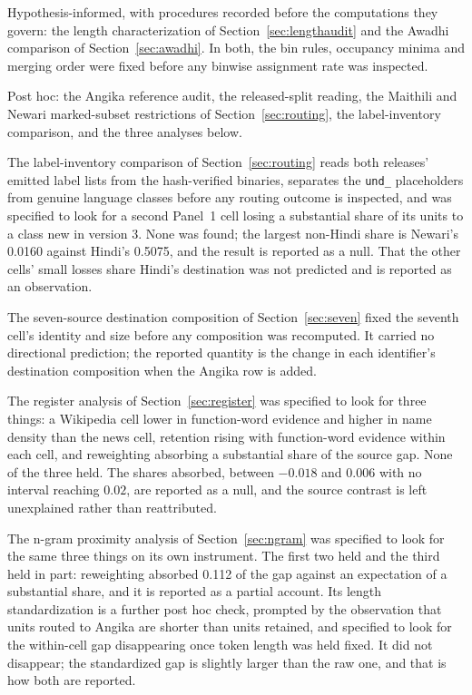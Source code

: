 \documentclass[final]{clv2025}
\newcommand{\lab}[1]{\texttt{#1}}
\begin{document}
Hypothesis-informed, with procedures recorded before the computations they govern: the length characterization of Section~\ref{sec:lengthaudit} and the Awadhi comparison of Section~\ref{sec:awadhi}. In both, the bin rules, occupancy minima and merging order were fixed before any binwise assignment rate was inspected.

Post hoc: the Angika reference audit, the released-split reading, the Maithili and Newari marked-subset restrictions of Section~\ref{sec:routing}, the label-inventory comparison, and the three analyses below.

The label-inventory comparison of Section~\ref{sec:routing} reads both releases' emitted label lists from the hash-verified binaries, separates the \lab{und\_} placeholders from genuine language classes before any routing outcome is inspected, and was specified to look for a second Panel~1 cell losing a substantial share of its units to a class new in version 3. None was found; the largest non-Hindi share is Newari's 0.0160 against Hindi's 0.5075, and the result is reported as a null. That the other cells' small losses share Hindi's destination was not predicted and is reported as an observation.

The seven-source destination composition of Section~\ref{sec:seven} fixed the seventh cell's identity and size before any composition was recomputed. It carried no directional prediction; the reported quantity is the change in each identifier's destination composition when the Angika row is added.

The register analysis of Section~\ref{sec:register} was specified to look for three things: a Wikipedia cell lower in function-word evidence and higher in name density than the news cell, retention rising with function-word evidence within each cell, and reweighting absorbing a substantial share of the source gap. None of the three held. The shares absorbed, between $-0.018$ and $0.006$ with no interval reaching $0.02$, are reported as a null, and the source contrast is left unexplained rather than reattributed.

The n-gram proximity analysis of Section~\ref{sec:ngram} was specified to look for the same three things on its own instrument. The first two held and the third held in part: reweighting absorbed 0.112 of the gap against an expectation of a substantial share, and it is reported as a partial account. Its length standardization is a further post hoc check, prompted by the observation that units routed to Angika are shorter than units retained, and specified to look for the within-cell gap disappearing once token length was held fixed. It did not disappear; the standardized gap is slightly larger than the raw one, and that is how both are reported.
\end{document}
